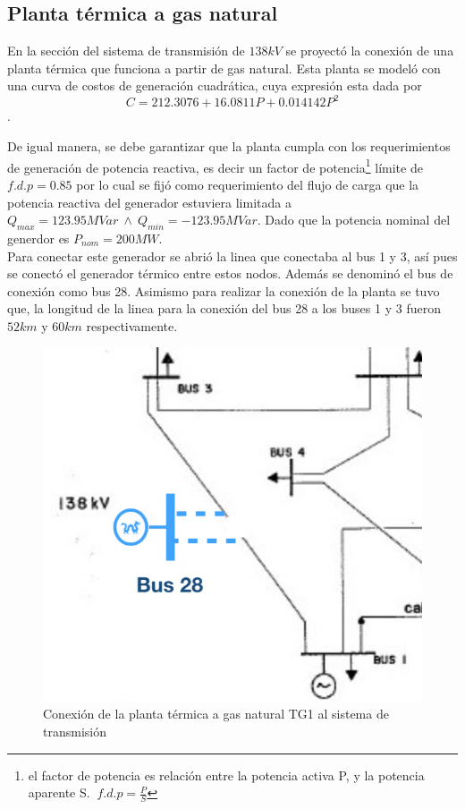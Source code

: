 \documentclass{article}
\begin{document}
\subsection{Planta térmica a gas natural }
En la sección del sistema de transmisión de $138kV$ se proyectó la conexión de una planta térmica que funciona a partir de gas natural. Esta planta se modeló con una curva de costos de generación cuadrática, cuya expresión esta dada por $$C=212.3076 + 16.0811P +0.014142P^2 $$ .

De igual manera, se debe garantizar que la planta cumpla con los requerimientos de generación de potencia reactiva, es decir un factor de potencia\footnote{el factor de potencia es relación entre la potencia activa P, y la potencia aparente S. $~f.d.p=\frac{P}{S}$} límite de $f.d.p=0.85$ por lo cual se fijó como requerimiento del flujo de carga que la potencia reactiva del generador estuviera limitada a $Q_{max}=123.95 MVar ~\land ~ Q_{min}=-123.95 MVar$. Dado que la potencia nominal del generdor es $P_{nom}=200MW$.\\

Para conectar este generador se abrió la linea que conectaba al bus 1 y 3, así pues se conectó el generador térmico entre estos nodos. Además se denominó el bus de conexión como bus 28. Asimismo para realizar la conexión de la planta se tuvo que, la longitud de la linea para la conexión del bus 28 a los buses 1 y 3 fueron $52km$ y $60km$ respectivamente. 
\begin{figure}[H]
    \centering
    \includegraphics[scale=0.6]{DragonTermico.png}
    \caption{Conexión de la planta térmica a gas natural TG1 al sistema de transmisión}
    \label{TG1}
\end{figure}
\end{document}
